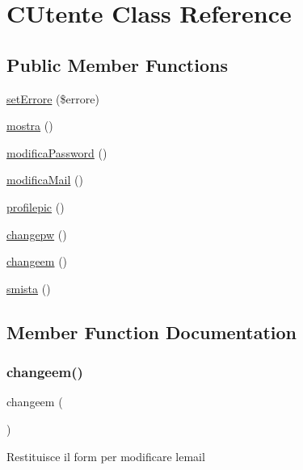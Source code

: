 \hypertarget{class_c_utente}{}\section{C\+Utente Class Reference}
\label{class_c_utente}
\subsection*{Public Member Functions}
\begin{DoxyCompactItemize}
\item 
\mbox{\hyperlink{class_c_utente_a9c4c3362aa5a2db624792c7cf90711e2}{set\+Errore}} (\$errore)
\item 
\mbox{\hyperlink{class_c_utente_a67a2a3bf6a01618020c3dcb546b9f5d8}{mostra}} ()
\item 
\mbox{\hyperlink{class_c_utente_af3fc2d0291f11cc62479a15fa6167266}{modifica\+Password}} ()
\item 
\mbox{\hyperlink{class_c_utente_a7090c2a3eb07813b3a5c163bf470f2fe}{modifica\+Mail}} ()
\item 
\mbox{\hyperlink{class_c_utente_a435511048d4049456f0c24c988a9c628}{profilepic}} ()
\item 
\mbox{\hyperlink{class_c_utente_a8b06e08492800ad20e31dc9066cf0839}{changepw}} ()
\item 
\mbox{\hyperlink{class_c_utente_a261e4d68ece246b596a0386596888d5a}{changeem}} ()
\item 
\mbox{\hyperlink{class_c_utente_afc7ba180569cef3535974cfc4a1211f1}{smista}} ()
\end{DoxyCompactItemize}


\subsection{Member Function Documentation}
\mbox{\label{class_c_utente_a261e4d68ece246b596a0386596888d5a}} 
\subsubsection{\texorpdfstring{changeem()}{changeem()}}
{\footnotesize\ttfamily changeem (\begin{DoxyParamCaption}{ }\end{DoxyParamCaption})}

Restituisce il form per modificare l\textquotesingle{}email

